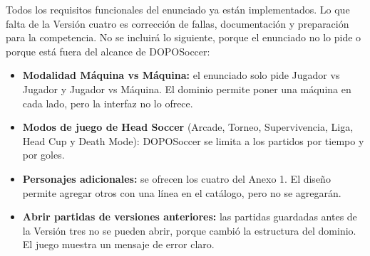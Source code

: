 \documentclass[11pt,letterpaper]{article}
\begin{document}
Todos los requisitos funcionales del enunciado ya están implementados. Lo que falta de la Versión cuatro es corrección de fallas, documentación y preparación para la competencia. No se incluirá lo siguiente, porque el enunciado no lo pide o porque está fuera del alcance de DOPOSoccer:

\begin{itemize}[leftmargin=14pt,itemsep=3pt]
  \item \textbf{Modalidad Máquina vs Máquina:} el enunciado solo pide Jugador vs Jugador y Jugador vs Máquina. El dominio permite poner una máquina en cada lado, pero la interfaz no lo ofrece.
  \item \textbf{Modos de juego de Head Soccer} (Arcade, Torneo, Supervivencia, Liga, Head Cup y Death Mode): DOPOSoccer se limita a los partidos por tiempo y por goles.
  \item \textbf{Personajes adicionales:} se ofrecen los cuatro del Anexo 1. El diseño permite agregar otros con una línea en el catálogo, pero no se agregarán.
  \item \textbf{Abrir partidas de versiones anteriores:} las partidas guardadas antes de la Versión tres no se pueden abrir, porque cambió la estructura del dominio. El juego muestra un mensaje de error claro.
\end{itemize}
\end{document}
